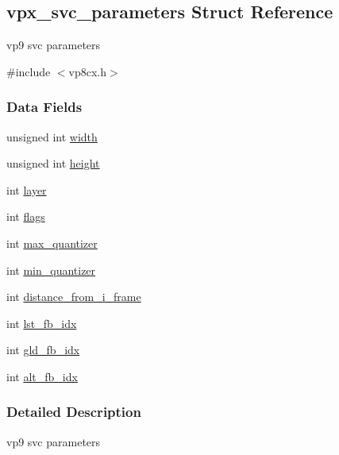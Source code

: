 \hypertarget{structvpx__svc__parameters}{\subsection{vpx\+\_\+svc\+\_\+parameters Struct Reference}
\label{structvpx__svc__parameters}
}


vp9 svc parameters  




{\ttfamily \#include $<$vp8cx.\+h$>$}

\subsubsection*{Data Fields}
\begin{DoxyCompactItemize}
\item 
unsigned int \hyperlink{structvpx__svc__parameters_aaf9780718072da62f92440cb2b7343b9}{width}
\item 
unsigned int \hyperlink{structvpx__svc__parameters_ac7af8c9f54e7b2a96b0c30a1004bd45b}{height}
\item 
int \hyperlink{structvpx__svc__parameters_a5f4d45ab6144eb13a3f27809651b40ef}{layer}
\item 
int \hyperlink{structvpx__svc__parameters_a9324b3015839560c5e2bfd1dd550b9aa}{flags}
\item 
int \hyperlink{structvpx__svc__parameters_ac890a24e3ea26902f8d19552f8b7f3c7}{max\+\_\+quantizer}
\item 
int \hyperlink{structvpx__svc__parameters_a4073b4749d687f969d6b23826d9ccefd}{min\+\_\+quantizer}
\item 
int \hyperlink{structvpx__svc__parameters_a0b04ebc9edfc8df09a1b9f65ba2d2ef6}{distance\+\_\+from\+\_\+i\+\_\+frame}
\item 
int \hyperlink{structvpx__svc__parameters_a75d36a52bb1d3a001c668cd577ea7f8b}{lst\+\_\+fb\+\_\+idx}
\item 
int \hyperlink{structvpx__svc__parameters_a1465c3f1805fe1ccf45835b980ee113e}{gld\+\_\+fb\+\_\+idx}
\item 
int \hyperlink{structvpx__svc__parameters_acca4a8ad748ae875e046daece3cd6590}{alt\+\_\+fb\+\_\+idx}
\end{DoxyCompactItemize}


\subsubsection{Detailed Description}
vp9 svc parameters 


